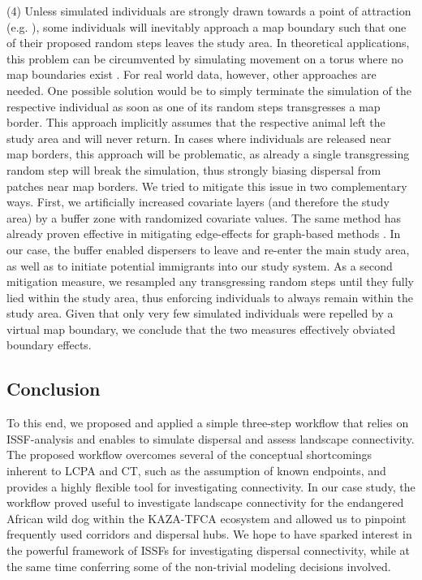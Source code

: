 \documentclass[abstract=on,10pt,a4paper,bibliography=totocnumbered]{article}
\begin{document}
(4) Unless simulated individuals are strongly drawn towards a point of
attraction (e.g. \cite{Signer.2017}), some individuals will inevitably approach
a map boundary such that one of their proposed random steps leaves the study
area. In theoretical applications, this problem can be circumvented by
simulating movement on a torus where no map boundaries exist \citep{Hodel.2022}.
For real world data, however, other approaches are needed. One possible solution
would be to simply terminate the simulation of the respective individual as soon
as one of its random steps transgresses a map border. This approach implicitly
assumes that the respective animal left the study area and will never return. In
cases where individuals are released near map borders, this approach will be
problematic, as already a single transgressing random step will break the
simulation, thus strongly biasing dispersal from patches near map borders. We
tried to mitigate this issue in two complementary ways. First, we artificially
increased covariate layers (and therefore the study area) by a buffer zone with
randomized covariate values. The same method has already proven effective in
mitigating edge-effects for graph-based methods \citep{Koen.2010}. In our case,
the buffer enabled dispersers to leave and re-enter the main study area, as well
as to initiate potential immigrants into our study system. As a second
mitigation measure, we resampled any transgressing random steps until they fully
lied within the study area, thus enforcing individuals to always remain within
the study area. Given that only very few simulated individuals were repelled by
a virtual map boundary, we conclude that the two measures effectively obviated
boundary effects.

\subsection{Conclusion}
To this end, we proposed and applied a simple three-step workflow that relies on
ISSF-analysis and enables to simulate dispersal and assess landscape
connectivity. The proposed workflow overcomes several of the conceptual
shortcomings inherent to LCPA and CT, such as the assumption of known endpoints,
and provides a highly flexible tool for investigating connectivity. In our case
study, the workflow proved useful to investigate landscape connectivity for the
endangered African wild dog within the KAZA-TFCA ecosystem and allowed us to
pinpoint frequently used corridors and dispersal hubs. We hope to have sparked
interest in the powerful framework of ISSFs for investigating dispersal
connectivity, while at the same time conferring some of the non-trivial modeling
decisions involved.
\end{document}
